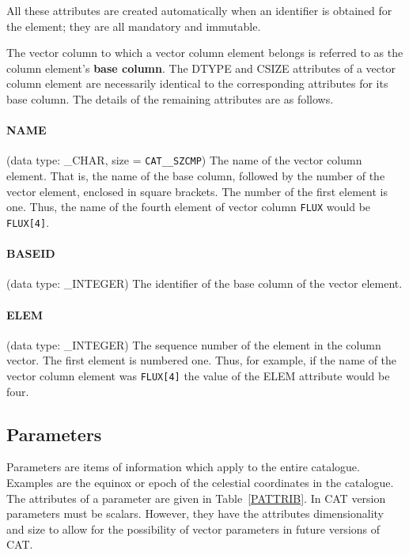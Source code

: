 All these attributes are created automatically when an identifier is
obtained for the element; they are all mandatory and immutable.

The vector column to which a vector column element belongs is
referred to as the column element's {\bf base column}. The DTYPE and
CSIZE attributes of a vector column element are necessarily identical
to the corresponding attributes for its base column. The details of the
remaining attributes are as follows.

\paragraph{NAME}
(data type: \_CHAR, size = {\tt CAT\_\_SZCMP})
The name of the vector column element. That is, the name of the base
column, followed by the number of the vector element, enclosed in
square brackets. The number of the first element is one. Thus, the name
of the fourth element of vector column {\tt FLUX} would be {\tt
FLUX[4]}.

\paragraph{BASEID}
(data type: \_INTEGER)
The identifier of the base column of the vector element.

\paragraph{ELEM}
(data type: \_INTEGER)
The sequence number of the element in the column vector. The first
element is numbered one. Thus, for example, if the name of the vector
column element was {\tt FLUX[4]} the value of the ELEM attribute
would be four.


\subsection{\label{PARS}Parameters}

Parameters are items of information which apply to the entire catalogue.
Examples are the equinox or epoch of the celestial coordinates in the
catalogue. The attributes of a parameter are given in
Table~\ref{PATTRIB}. In CAT version \CATversion parameters must be
scalars. However, they have the attributes dimensionality and size to
allow for the possibility of vector parameters in future versions of
CAT.

